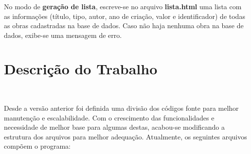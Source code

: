\documentclass{article}
\begin{document}
No modo de \textbf{geração de lista}, escreve-se no arquivo \textbf{lista.html} uma lista com as informações (título, tipo, autor, ano de criação, valor e identificador) de todas as obras cadastradas na base de dados. Caso não haja nenhuma obra na base de dados, exibe-se uma mensagem de erro.

\section{Descrição do Trabalho}\

Desde a versão anterior foi definida uma divisão dos códigos fonte para melhor manutenção e escalabilidade. Com o crescimento das funcionalidades e necessidade de melhor base para algumas destas, acabou-se modificando a estrutura dos arquivos para melhor adequação. Atualmente, os seguintes arquivos compõem o programa:
\end{document}
